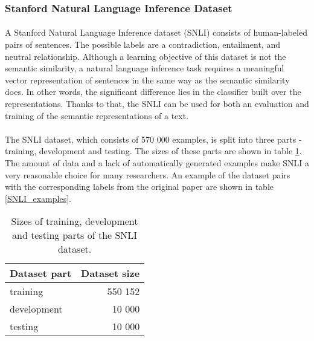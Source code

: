 \subsubsection{Stanford Natural Language Inference Dataset}\label{snli}
\paragraph{}
A Stanford Natural Language Inference dataset (SNLI) \cite{snli} consists of human-labeled pairs of sentences. The possible labels are a contradiction, entailment, and neutral relationship. Although a learning objective of this dataset is not the semantic similarity, a natural language inference task requires a meaningful vector representation of sentences in the same way as the semantic similarity does. In other words, the significant difference lies in the classifier built over the representations. Thanks to that, the SNLI can be used for both an evaluation and training of the semantic representations of a text. 

\paragraph{}
The SNLI dataset, which consists of 570 000 examples, is split into three parts - training, development and testing. The sizes of these parts are shown in table \ref{SNLI_counts}. The amount of data and a lack of automatically generated examples make SNLI a very reasonable choice for many researchers. An example of the dataset pairs with the corresponding labels from the original paper \cite{snli} are shown in table \ref{SNLI_examples}.

\begin{table}[h!]
\begin{center}
	\begin{tabular}{l r} 
		\hline
		\textbf{Dataset part} & \textbf{Dataset size} \\ [0.5ex] 
		\hline\hline
		training & 550 152 \\ 
		development & 10 000 \\
		testing & 10 000 \\ 
		\hline
	\end{tabular}
\end{center}
\caption{Sizes of training, development and testing parts of the SNLI dataset.}
\label{SNLI_counts}
\end{table}

